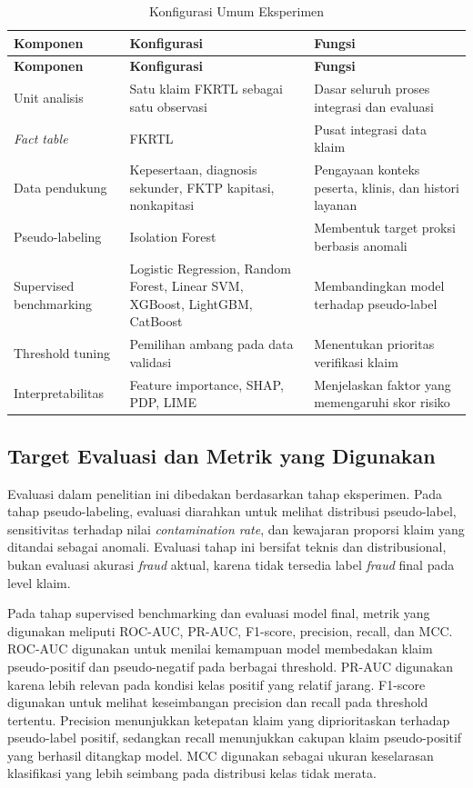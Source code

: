 \begin{longtable}[]{@{}p{}p{}p{}@{}}
\caption{Konfigurasi Umum Eksperimen}\label{tab:konfigurasi-umum-eksperimen}\\
\toprule
\textbf{Komponen} & \textbf{Konfigurasi} & \textbf{Fungsi} \\
\midrule
\endfirsthead
\toprule
\textbf{Komponen} & \textbf{Konfigurasi} & \textbf{Fungsi} \\
\midrule
\endhead
\bottomrule
\endfoot
Unit analisis & Satu klaim FKRTL sebagai satu observasi & Dasar seluruh proses integrasi dan evaluasi \\
\emph{Fact table} & FKRTL & Pusat integrasi data klaim \\
Data pendukung & Kepesertaan, diagnosis sekunder, FKTP kapitasi, nonkapitasi & Pengayaan konteks peserta, klinis, dan histori layanan \\
Pseudo-labeling & Isolation Forest & Membentuk target proksi berbasis anomali \\
Supervised benchmarking & Logistic Regression, Random Forest, Linear SVM, XGBoost, LightGBM, CatBoost & Membandingkan model terhadap pseudo-label \\
Threshold tuning & Pemilihan ambang pada data validasi & Menentukan prioritas verifikasi klaim \\
Interpretabilitas & Feature importance, SHAP, PDP, LIME & Menjelaskan faktor yang memengaruhi skor risiko \\
\end{longtable}

\subsection{Target Evaluasi dan Metrik yang Digunakan}\label{target-evaluasi-dan-metrik}

Evaluasi dalam penelitian ini dibedakan berdasarkan tahap eksperimen. Pada tahap pseudo-labeling, evaluasi diarahkan untuk melihat distribusi pseudo-label, sensitivitas terhadap nilai \emph{contamination rate}, dan kewajaran proporsi klaim yang ditandai sebagai anomali. Evaluasi tahap ini bersifat teknis dan distribusional, bukan evaluasi akurasi \emph{fraud} aktual, karena tidak tersedia label \emph{fraud} final pada level klaim.

Pada tahap supervised benchmarking dan evaluasi model final, metrik yang digunakan meliputi ROC-AUC, PR-AUC, F1-score, precision, recall, dan MCC. ROC-AUC digunakan untuk menilai kemampuan model membedakan klaim pseudo-positif dan pseudo-negatif pada berbagai threshold. PR-AUC digunakan karena lebih relevan pada kondisi kelas positif yang relatif jarang. F1-score digunakan untuk melihat keseimbangan precision dan recall pada threshold tertentu. Precision menunjukkan ketepatan klaim yang diprioritaskan terhadap pseudo-label positif, sedangkan recall menunjukkan cakupan klaim pseudo-positif yang berhasil ditangkap model. MCC digunakan sebagai ukuran keselarasan klasifikasi yang lebih seimbang pada distribusi kelas tidak merata.

